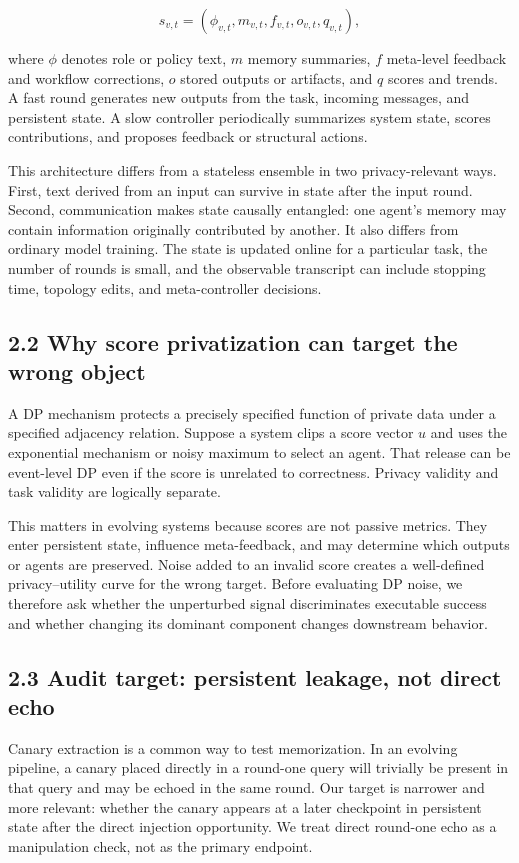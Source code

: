 \documentclass{article}
\begin{document}
\[
s_{v,t}=(\phi_{v,t},m_{v,t},f_{v,t},o_{v,t},q_{v,t}),
\]

where \(\phi\) denotes role or policy text, \(m\) memory summaries, \(f\) meta-level feedback and workflow corrections, \(o\) stored outputs or artifacts, and \(q\) scores and trends. A fast round generates new outputs from the task, incoming messages, and persistent state. A slow controller periodically summarizes system state, scores contributions, and proposes feedback or structural actions.

This architecture differs from a stateless ensemble in two privacy-relevant ways. First, text derived from an input can survive in state after the input round. Second, communication makes state causally entangled: one agent's memory may contain information originally contributed by another. It also differs from ordinary model training. The state is updated online for a particular task, the number of rounds is small, and the observable transcript can include stopping time, topology edits, and meta-controller decisions.

\subsection{2.2 Why score privatization can target the wrong object}

A DP mechanism protects a precisely specified function of private data under a specified adjacency relation. Suppose a system clips a score vector \(u\) and uses the exponential mechanism or noisy maximum to select an agent. That release can be event-level DP even if the score is unrelated to correctness. Privacy validity and task validity are logically separate.

This matters in evolving systems because scores are not passive metrics. They enter persistent state, influence meta-feedback, and may determine which outputs or agents are preserved. Noise added to an invalid score creates a well-defined privacy--utility curve for the wrong target. Before evaluating DP noise, we therefore ask whether the unperturbed signal discriminates executable success and whether changing its dominant component changes downstream behavior.

\subsection{2.3 Audit target: persistent leakage, not direct echo}

Canary extraction is a common way to test memorization. In an evolving pipeline, a canary placed directly in a round-one query will trivially be present in that query and may be echoed in the same round. Our target is narrower and more relevant: whether the canary appears at a later checkpoint in persistent state after the direct injection opportunity. We treat direct round-one echo as a manipulation check, not as the primary endpoint.
\end{document}
